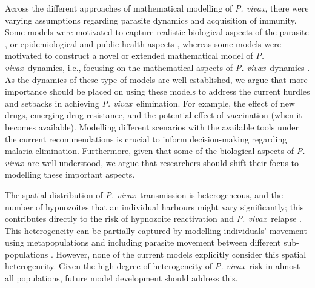 \documentclass[12pt]{article}
\newcommand{\pv}{\textit{P. vivax}}
\begin{document}
Across the different approaches of mathematical modelling of \pv, there were varying assumptions regarding parasite dynamics and acquisition of immunity. Some models were motivated to capture realistic biological aspects of the parasite \cite{de1988modulation,white2014modelling,anwar2022multiscale}, or epidemiological and public health aspects \cite{de1991mathematical,ishikawa2000prevalence,ishikawa2003mathematical,fujita2006modeling,aguas2012modeling,chamchod2013modeling,roy2013potential,robinson2015strategies,pizzitutti2015validated,white2016variation,white2018mathematical,silal2019malaria,gharakhanlou2019developing,corder2020modelling,nekkab2021estimated,huber2021radical,obadia2022developing,anwar2023optimal,tasman2022assessing,white2022potential,mehra2022hypnozoite,walker2023model}, whereas some models were motivated to construct a novel or extended mathematical model of \pv~dynamics, i.e., focusing on the mathematical aspects of \pv~dynamics \cite{kammanee2001basic,pongsumpun2007transmission,pongsumpun2008mathematical,pongsumpun2008plasmodium,pongsumpun2010impact,nah2010dilution,huo2014stability,prihantini2017stability,kammanee2019mathematical,gebremichaelrelapse,kim2019effects,kim2020mathematical,nyaberi2020mathematical,ghosh2020mathematical,aldila2021superinfection,abimbade2022recurrent,olaniyi2023optimal}. As the dynamics of these type of models are well established, we argue that more importance should be placed on using these models to address the current hurdles and setbacks in achieving \pv~elimination. For example, the effect of new drugs, emerging drug resistance, and the potential effect of vaccination (when it becomes available). Modelling different scenarios with the available tools under the current recommendations is crucial to inform decision-making regarding malaria elimination. Furthermore, given that some of the biological aspects of \pv~are well understood, we argue that researchers should shift their focus to modelling these important aspects. 

The spatial distribution of \pv~transmission is heterogeneous, and the number of hypnozoites that an individual harbours might vary significantly; this contributes directly to the risk of hypnozoite reactivation and \pv~relapse \cite{popovici2015challenges,stadler2022population}. This heterogeneity can be partially captured by modelling individuals' movement using metapopulations and including parasite movement between different sub-populations \cite{white2018mathematical,nekkab2021estimated}. However, none of the current models explicitly consider this spatial heterogeneity. Given the high degree of heterogeneity of \pv~risk in almost all populations, future model development should address this.
\end{document}
